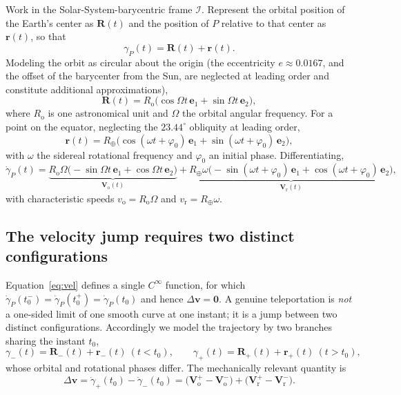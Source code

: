 \documentclass[11pt]{article}
\begin{document}
	Work in the Solar-System-barycentric frame $\mathcal I$. Represent the
	orbital position of the Earth's center as $\mathbf R(t)$ and the
	position of $P$ relative to that center as $\mathbf r(t)$, so that
	\begin{equation}
		\gamma_P(t)=\mathbf R(t)+\mathbf r(t).
		\label{eq:decomp}
	\end{equation}
	Modeling the orbit as circular about the origin (the eccentricity
	$e\approx 0.0167$, and the offset of the barycenter from the Sun, are
	neglected at leading order and constitute additional approximations),
	\begin{equation}
		\mathbf R(t)=
		R_{\mathrm o}\bigl(\cos\Omega t\,\mathbf e_1
		+\sin\Omega t\,\mathbf e_2\bigr),
		\label{eq:orbit}
	\end{equation}
	where $R_{\mathrm o}$ is one astronomical unit and $\Omega$ the orbital
	angular frequency. For a point on the equator, neglecting the
	$23.44^\circ$ obliquity at leading order,
	\begin{equation}
		\mathbf r(t)=
		R_{\oplus}\bigl(\cos(\omega t+\varphi_0)\,\mathbf e_1
		+\sin(\omega t+\varphi_0)\,\mathbf e_2\bigr),
		\label{eq:spin}
	\end{equation}
	with $\omega$ the sidereal rotational frequency and $\varphi_0$ an
	initial phase. Differentiating,
	\begin{equation}
		\dot\gamma_P(t)=
		\underbrace{R_{\mathrm o}\Omega\bigl(-\sin\Omega t\,\mathbf e_1
			+\cos\Omega t\,\mathbf e_2\bigr)}_{\mathbf V_{\mathrm o}(t)}
		+\underbrace{R_{\oplus}\omega\bigl(-\sin(\omega t+\varphi_0)\,
			\mathbf e_1+\cos(\omega t+\varphi_0)\,\mathbf e_2\bigr)}_{
			\mathbf V_{\mathrm r}(t)},
		\label{eq:vel}
	\end{equation}
	with characteristic speeds $v_{\mathrm o}=R_{\mathrm o}\Omega$ and
	$v_{\mathrm r}=R_{\oplus}\omega$.
	
	\subsection{The velocity jump requires two distinct configurations}
	
	Equation~\eqref{eq:vel} defines a single $C^{\infty}$ function, for
	which $\dot\gamma_P(t_0^{-})=\dot\gamma_P(t_0^{+})=\dot\gamma_P(t_0)$
	and hence $\Delta\mathbf v=\mathbf 0$. A genuine teleportation is
	\emph{not} a one-sided limit of one smooth curve at one instant; it is
	a jump between two distinct configurations. Accordingly we model the
	trajectory by two branches sharing the instant $t_0$,
	\begin{equation}
		\gamma_{-}(t)=\mathbf R_{-}(t)+\mathbf r_{-}(t)\ (t<t_0),
		\qquad
		\gamma_{+}(t)=\mathbf R_{+}(t)+\mathbf r_{+}(t)\ (t>t_0),
		\label{eq:branches}
	\end{equation}
	whose orbital and rotational phases differ. The mechanically relevant
	quantity is
	\begin{equation}
		\Delta\mathbf v=\dot\gamma_{+}(t_0)-\dot\gamma_{-}(t_0)
		=\bigl(\mathbf V_{\mathrm o}^{+}-\mathbf V_{\mathrm o}^{-}\bigr)
		+\bigl(\mathbf V_{\mathrm r}^{+}-\mathbf V_{\mathrm r}^{-}\bigr).
		\label{eq:dv}
	\end{equation}
	
\end{document}
